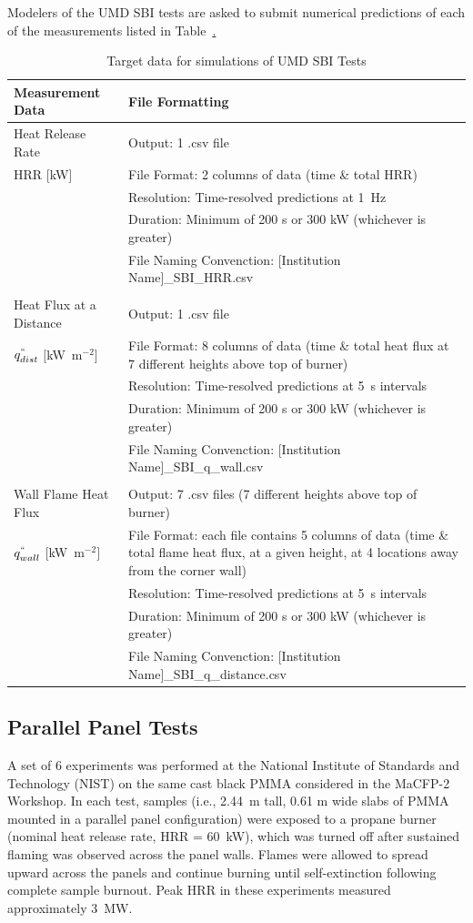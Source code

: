 \documentclass[12pt]{article}
\begin{document}
Modelers of the UMD SBI tests are asked to submit numerical predictions of each of the measurements listed in Table~\href{table:SBI}.
\begin{table}[htb]
\caption{\label{table:SBI} Target data for simulations of UMD SBI Tests}
\begin{tabular}{p{0.25\linewidth} | p{0.75\linewidth}}
\hline
\textbf{Measurement Data}       	& \textbf{File Formatting } \\
\hline
Heat Release Rate 	& Output: 1 .csv file\\
HRR $[$kW$]$& File Format: 2 columns of data (time \& total HRR)\\
	& Resolution: Time-resolved predictions at 1~Hz \\
	& Duration: Minimum of 200 s or 300 kW (whichever is greater) \\
	& File Naming Convenction: [Institution Name]\_SBI\_HRR.csv \\
&	\\
Heat Flux at a Distance  & Output: 1 .csv file\\
$q^{``}_{dist}$ $[$kW~m$^{-2}$$]$& File Format: 8 columns of data (time \& total heat flux at 7 different heights above top of burner)\\ 
	& Resolution: Time-resolved predictions at 5~s intervals \\
	& Duration: Minimum of 200 s or 300 kW (whichever is greater) \\
	& File Naming Convenction: [Institution Name]\_SBI\_q\_wall.csv \\
&	\\
Wall Flame Heat Flux & Output: 7 .csv files (7 different heights above top of burner) \\
$q^{``}_{wall}$ $[$kW~m$^{-2}$$]$& File Format: each file contains 5 columns of data (time \& total flame heat flux, at a given height, at 4 locations away from the corner wall)\\
	& Resolution: Time-resolved predictions at 5~s intervals \\
	& Duration: Minimum of 200 s or 300 kW (whichever is greater) \\
	& File Naming Convenction: [Institution Name]\_SBI\_q\_distance.csv \\
\hline
\end{tabular}
\end{table}

\FloatBarrier
\subsection {Parallel Panel Tests}
A set of 6 experiments was performed at the National Institute of Standards and Technology (NIST) on the same cast black PMMA considered in the MaCFP-2 Workshop. In each test, samples (i.e., 2.44~m tall, 0.61 m wide slabs of PMMA mounted in a parallel panel configuration) were exposed to a propane burner (nominal heat release rate, HRR = 60~kW), which was turned off after sustained flaming was observed across the panel walls. Flames were allowed to spread upward across the panels and continue burning until self-extinction following complete sample burnout. Peak HRR in these experiments measured approximately 3~MW.
\end{document}
